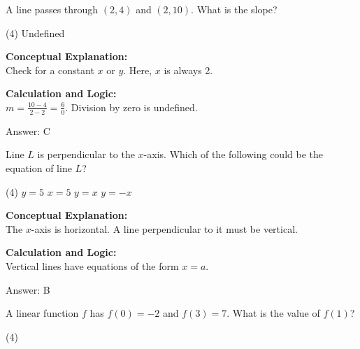 \documentclass[11pt,paper=a4,answers]{exam}
\begin{document}
\begin{questions}
\vspace{20pt}

\question
A line passes through $(2, 4)$ and $(2, 10)$. What is the slope?
\begin{tasks}(4)
    \task Undefined
\end{tasks}

\begin{solution}
\textbf{Conceptual Explanation:} \\
Check for a constant $x$ or $y$. Here, $x$ is always 2.

\vspace{10pt}
\textbf{Calculation and Logic:} \\
$m = \frac{10 - 4}{2 - 2} = \frac{6}{0}$. Division by zero is undefined.

\vspace{15pt}
Answer: \colorbox{yellow!100}{C}
\end{solution}

\vspace{20pt}

\question
Line $L$ is perpendicular to the $x$-axis. Which of the following could be the equation of line $L$?
\begin{tasks}(4)
    \task $y = 5$
    \task $x = 5$
    \task $y = x$
    \task $y = -x$
\end{tasks}

\begin{solution}
\textbf{Conceptual Explanation:} \\
The $x$-axis is horizontal. A line perpendicular to it must be vertical.

\vspace{10pt}
\textbf{Calculation and Logic:} \\
Vertical lines have equations of the form $x = a$.

\vspace{15pt}
Answer: \colorbox{yellow!100}{B}
\end{solution}

\vspace{20pt}

\question
A linear function $f$ has $f(0) = -2$ and $f(3) = 7$. What is the value of $f(1)$?
\begin{tasks}(4)
\end{tasks}


\end{questions}
\end{document}
